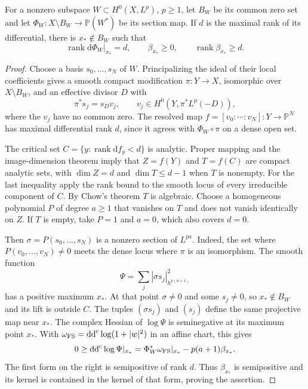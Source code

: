 \begin{proposition}\label{prop:section-map-curvature-rank}
For a nonzero subspace $W\subset H^0(X,L^p)$, $p\geq1$, let $B_W$ be its common zero set and let $\Phi_W\colon X\setminus B_W\to\mathbb P(W^*)$ be its section map. If $d$ is the maximal rank of its differential, there is $x_*\notin B_W$ such that
\[
 \operatorname{rank}\mathrm d\Phi_W|_{x_*}=d,
 \qquad \beta_{x_*}\geq0,
 \qquad \operatorname{rank}\beta_{x_*}\geq d.
\]
\end{proposition}
\begin{proof}
Choose a basis $s_0,\ldots,s_N$ of $W$. Principalizing the ideal of their local coefficients gives a smooth compact modification $\pi\colon Y\to X$, isomorphic over $X\setminus B_W$, and an effective divisor $D$ with
\[
 \pi^*s_j=s_Dv_j,\qquad
 v_j\in H^0(Y,\pi^*L^p(-D)),
\]
where the $v_j$ have no common zero. The resolved map $f=[v_0:\cdots:v_N]\colon Y\to\mathbb P^N$ has maximal differential rank $d$, since it agrees with $\Phi_W\circ\pi$ on a dense open set.

The critical set $C=\{y:\operatorname{rank}\mathrm df_y<d\}$ is analytic. Proper mapping and the image-dimension theorem imply that $Z=f(Y)$ and $T=f(C)$ are compact analytic sets, with $\dim Z=d$ and $\dim T\leq d-1$ when $T$ is nonempty. For the last inequality apply the rank bound to the smooth locus of every irreducible component of $C$. By Chow's theorem $T$ is algebraic. Choose a homogeneous polynomial $P$ of degree $a\geq1$ that vanishes on $T$ and does not vanish identically on $Z$. If $T$ is empty, take $P=1$ and $a=0$, which also covers $d=0$.

Then $\sigma=P(s_0,\ldots,s_N)$ is a nonzero section of $L^{pa}$. Indeed, the set where $P(v_0,\ldots,v_N)\ne0$ meets the dense locus where $\pi$ is an isomorphism. The smooth function
\[
 \Psi=\sum_j|\sigma s_j|_{h^{p(a+1)}}^2
\]
has a positive maximum $x_*$. At that point $\sigma\ne0$ and some $s_j\ne0$, so $x_*\notin B_W$ and its lift is outside $C$. The tuples $(\sigma s_j)$ and $(s_j)$ define the same projective map near $x_*$. The complex Hessian of $\log\Psi$ is seminegative at its maximum point $x_*$. With $\omega_{\mathrm{FS}}=\mathrm{dd}^{\mathrm{c}}\log(1+|w|^2)$ in an affine chart, this gives
\[
 0\geq\mathrm{dd}^{\mathrm{c}}\log\Psi|_{x_*}
   =\Phi_W^*\omega_{\mathrm{FS}}|_{x_*}
                    -p(a+1)\beta_{x_*}.
\]
The first form on the right is semipositive of rank $d$. Thus $\beta_{x_*}$ is semipositive and its kernel is contained in the kernel of that form, proving the assertion.
\end{proof}

